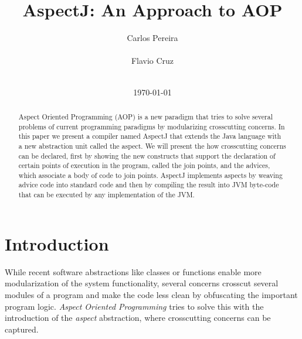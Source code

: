 \documentclass{template}
\begin{document}
\title{AspectJ: An Approach to AOP}


\author{
\alignauthor
Carlos Pereira\\
       \\
\alignauthor
Flavio Cruz\\
       \\
}
\date{\today}

\maketitle
\begin{abstract}
Aspect Oriented Programming (AOP) is a new paradigm that tries to solve several problems of
current programming paradigms by modularizing crosscutting concerns.
In this paper we present a compiler named AspectJ that extends
the Java language with a new abstraction unit called the aspect. We will present the
how crosscutting concerns can be declared, first by showing the new constructs that support
the declaration of certain points of execution in the program, called the join points, and the
advices, which associate a body of code to join points. AspectJ implements aspects by weaving advice
code into standard code and then by compiling the result into JVM byte-code that can be
executed by any implementation of the JVM.
 
\end{abstract}


\section{Introduction}

While recent software abstractions like classes or functions enable
more modularization of the system functionality, several concerns crosscut several modules of a program and make
the code less clean by obfuscating the important program logic. \emph{Aspect Oriented Programming} tries to solve this
with the introduction of the \emph{aspect} abstraction, where crosscutting concerns can be captured.
\end{document}
